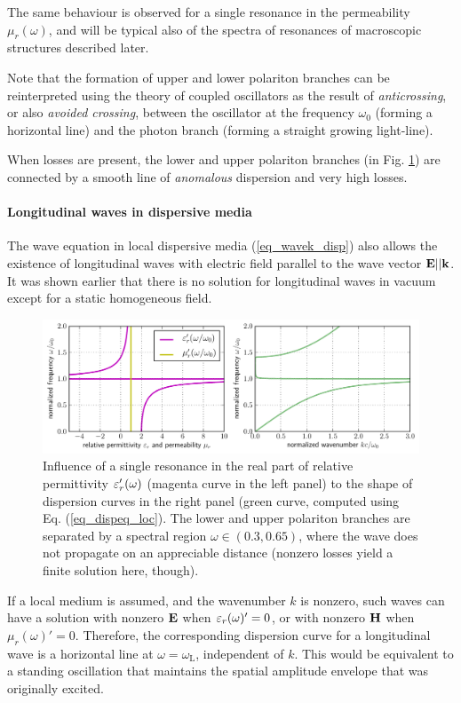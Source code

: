 The same behaviour is observed for a single resonance in the permeability $\mu_r(\omega)$, and will be typical also of the spectra of resonances of macroscopic structures described later.

Note that the formation of upper and lower polariton branches can be reinterpreted\cite{landau1984electrodynamics} using the theory of coupled oscillators as the result of \textit{anticrossing}, or also \textit{avoided crossing}, between the oscillator at the frequency $\omega_0$ (forming a horizontal line) and the photon branch (forming a straight growing light-line). \label{anticrossing}

When losses are present, the lower and upper polariton branches (in Fig. \ref{fg_dcsimpleel}) are connected by a smooth line of \textit{anomalous} dispersion and very high losses.  

\paragraph{Longitudinal waves in dispersive media} %
The wave equation in local dispersive media (\ref{eq_wavek_disp}) 
also allows the existence of longitudinal waves with electric field parallel to the wave vector $\mathbf{E} || {\mathbf{k}}$. It was shown earlier that there is no solution for longitudinal waves in vacuum except for a static homogeneous field.

\begin{figure}[t] \caption{Influence of a single resonance in the real part of relative permittivity $\varepsilon_r'(\omega)$ (magenta curve in the left panel) to the shape of dispersion curves in the right panel (green curve, computed using Eq. (\ref{eq_dispeq_loc}). The lower and upper polariton branches are separated by a spectral region $\omega \in (0.3, 0.65)$, where the wave does not propagate on an appreciable distance (nonzero losses yield a finite solution here, though).} \label{fg_dcsimpleel} \centering 
	\includegraphics[width=\textwidth]{img/dispersion_landau_lifshitz/dispersion_simple_el.pdf}
\end{figure}
If a local medium is assumed, and the wavenumber $k$ is nonzero, such waves can have a solution with nonzero $\mathbf{E}$ when $\varepsilon_r(\omega)' = 0$, or with nonzero $\mathbf{H}$ when $\mu_r(\omega)' = 0$. Therefore, the corresponding dispersion curve for a longitudinal wave is a horizontal line at $\omega = \omega_{\text{L}}$, independent of $k$. This would be equivalent to a standing oscillation that maintains the spatial amplitude envelope that was originally excited. 

